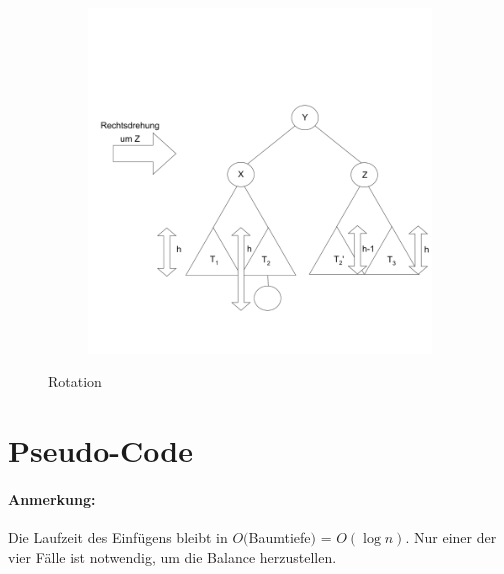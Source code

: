 \begin{figure}
\begin{subfigure}[H]{0.29\textwidth}
	\end{subfigure}
	\begin{subfigure}[H]{0.39\textwidth}
				\includegraphics[width=\linewidth]{11/Grafik/img7_doppelRotation_4.png}
	\end{subfigure}
	\caption{Rotation}
\end{figure}

\clearpage


\section{Pseudo-Code}


\paragraph{Anmerkung:} Die Laufzeit des Einfügens bleibt in $O($Baumtiefe$)$ = $O(\log{n})$. Nur einer der vier Fälle ist notwendig, um die Balance herzustellen. 